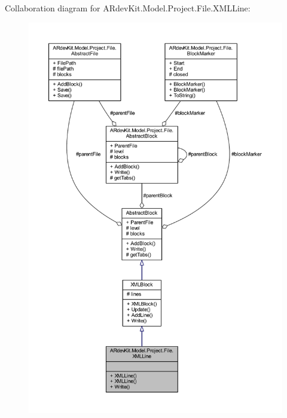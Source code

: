 Collaboration diagram for A\-Rdev\-Kit.\-Model.\-Project.\-File.\-X\-M\-L\-Line\-:
\nopagebreak
\begin{figure}[H]
\begin{center}
\leavevmode
\includegraphics[width=350pt]{class_a_rdev_kit_1_1_model_1_1_project_1_1_file_1_1_x_m_l_line__coll__graph}
\end{center}
\end{figure}
